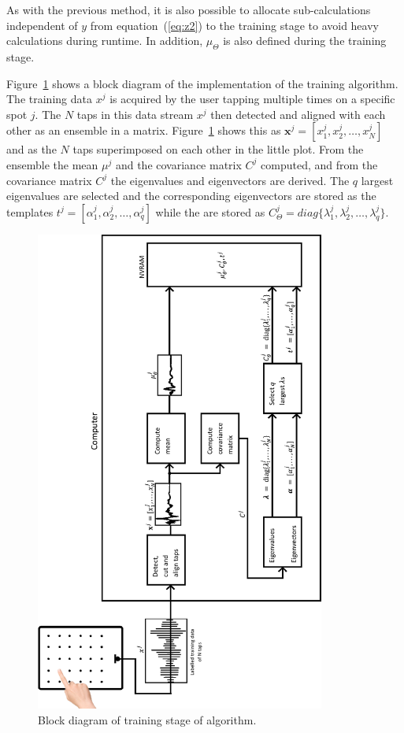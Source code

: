 As with the previous method, it is also possible to allocate sub-calculations independent of $y$ from equation~(\ref{eq:z2}) to the training stage to avoid heavy calculations during runtime. In addition, $\mu_\Theta$ is also defined during the training stage.

Figure~\ref{fig:trainingsytemRotate} shows a block diagram of the implementation of the training algorithm. The training data $x^j$ is acquired by the user tapping multiple times on a specific spot $j$. The $N$ taps in this data stream $x^j$ \DIFdelbegin {}\DIFdelend \DIFaddbegin {}\DIFaddend then detected and aligned with each other as an ensemble in a matrix. Figure~\ref{fig:trainingsytemRotate} shows this as $\textbf{x}^j =  [ x_1^j, x_2^j, \ldots , x_N^j ] $ and as the $N$ taps superimposed on each other in the little plot. From the ensemble the mean $\mu^j$ and the covariance matrix $C^j$ \DIFdelbegin {}\DIFdelend \DIFaddbegin {}\DIFaddend computed, and from the covariance matrix $C^j$ the eigenvalues and eigenvectors are derived. The $q$ largest eigenvalues are selected and the corresponding eigenvectors are stored as the templates $t^j = [\alpha^j_1,\alpha^j_2,\ldots,\alpha^j_q] $ while the \DIFdelbegin {}\DIFdelend \DIFaddbegin {}\DIFaddend are stored as $C_\Theta^j = diag\{\lambda_1^j,\lambda_2^j,\ldots,\lambda_q^j \}$.

\begin{figure}[!]
\centering
\includegraphics[width=360px]{trainingsytemRotate.pdf}
\caption{Block diagram of training stage of algorithm.}\label{fig:trainingsytemRotate}
\end{figure}

